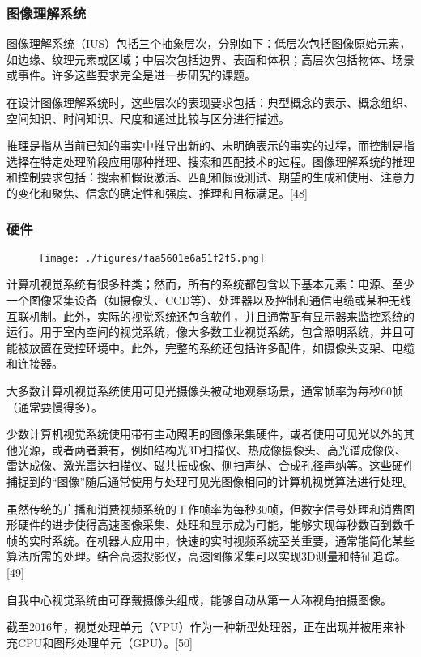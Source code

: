 \subsubsection{图像理解系统}  
图像理解系统（IUS）包括三个抽象层次，分别如下：低层次包括图像原始元素，如边缘、纹理元素或区域；中层次包括边界、表面和体积；高层次包括物体、场景或事件。许多这些要求完全是进一步研究的课题。

在设计图像理解系统时，这些层次的表现要求包括：典型概念的表示、概念组织、空间知识、时间知识、尺度和通过比较与区分进行描述。

推理是指从当前已知的事实中推导出新的、未明确表示的事实的过程，而控制是指选择在特定处理阶段应用哪种推理、搜索和匹配技术的过程。图像理解系统的推理和控制要求包括：搜索和假设激活、匹配和假设测试、期望的生成和使用、注意力的变化和聚焦、信念的确定性和强度、推理和目标满足。[48]
\subsubsection{硬件}
\begin{figure}[ht]
\centering
\texttt{[image: ./figures/faa5601e6a51f2f5.png]}
\caption{} \label{fig_JSJ_9}
\end{figure}
计算机视觉系统有很多种类；然而，所有的系统都包含以下基本元素：电源、至少一个图像采集设备（如摄像头、CCD等）、处理器以及控制和通信电缆或某种无线互联机制。此外，实际的视觉系统还包含软件，并且通常配有显示器来监控系统的运行。用于室内空间的视觉系统，像大多数工业视觉系统，包含照明系统，并且可能被放置在受控环境中。此外，完整的系统还包括许多配件，如摄像头支架、电缆和连接器。

大多数计算机视觉系统使用可见光摄像头被动地观察场景，通常帧率为每秒60帧（通常要慢得多）。

少数计算机视觉系统使用带有主动照明的图像采集硬件，或者使用可见光以外的其他光源，或者两者兼有，例如结构光3D扫描仪、热成像摄像头、高光谱成像仪、雷达成像、激光雷达扫描仪、磁共振成像、侧扫声纳、合成孔径声纳等。这些硬件捕捉到的“图像”随后通常使用与处理可见光图像相同的计算机视觉算法进行处理。

虽然传统的广播和消费视频系统的工作帧率为每秒30帧，但数字信号处理和消费图形硬件的进步使得高速图像采集、处理和显示成为可能，能够实现每秒数百到数千帧的实时系统。在机器人应用中，快速的实时视频系统至关重要，通常能简化某些算法所需的处理。结合高速投影仪，高速图像采集可以实现3D测量和特征追踪。[49]

自我中心视觉系统由可穿戴摄像头组成，能够自动从第一人称视角拍摄图像。

截至2016年，视觉处理单元（VPU）作为一种新型处理器，正在出现并被用来补充CPU和图形处理单元（GPU）。[50]